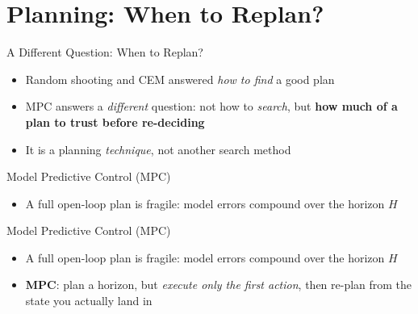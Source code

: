\section{Planning: When to Replan?}
\begin{frame}{A Different Question: When to Replan?}
\begin{itemize}
    \item Random shooting and CEM answered \emph{how to find} a good plan
    \item MPC answers a \emph{different} question: not how to \emph{search},
          but \textbf{how much of a plan to trust before re-deciding}
    \item It is a planning \emph{technique}, not another search method
\end{itemize}
\end{frame}

\begin{frame}{Model Predictive Control (MPC)}
\begin{itemize}
    \item A full open-loop plan is fragile: model errors compound over the
          horizon $H$
\end{itemize}
\end{frame}

\begin{frame}{Model Predictive Control (MPC)}
\begin{itemize}
    \item A full open-loop plan is fragile: model errors compound over the
          horizon $H$
    \item \textbf{MPC}: plan a horizon, but \emph{execute only the first action},
          then re-plan from the state you actually land in
\end{itemize}
\vspace{0.5em}
\centering
{}
\end{frame}


